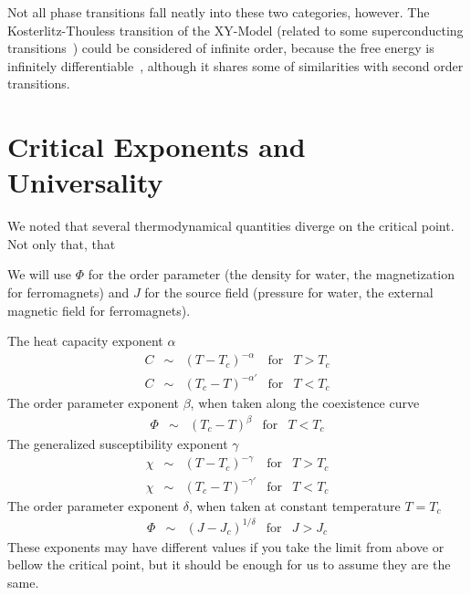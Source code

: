 Not all phase transitions fall neatly into these two categories, however. The
Kosterlitz-Thouless transition of the XY-Model (related to some superconducting
transitions~\cite{Resnick1981}) could be considered of infinite order, because
the free energy is infinitely differentiable~\cite{Kosterlitz1973}, although it
shares some of similarities with second order transitions.


\section{Critical Exponents and Universality}
\label{sec:universality}

We noted that several thermodynamical quantities diverge on the critical point.
Not only that, that

We will use $\Phi$ for the order parameter (the density for water, the
magnetization for ferromagnets) and $J$ for the source field (pressure for
water, the external magnetic field for ferromagnets).

The heat capacity exponent $\alpha$
\begin{equation}
    \begin{array}{ccccc}
        C & \sim & {\left(T-T_c\right)}^{-\alpha}  & \mbox{for} & T > T_c \\
        C & \sim & {\left(T_c-T\right)}^{-\alpha'} & \mbox{for} & T < T_c
    \end{array}
\end{equation}
The order parameter exponent $\beta$, when taken along the coexistence curve 
\begin{equation}
    \begin{array}{ccccc}
        \Phi  & \sim & {\left(T_c-T\right)}^{\beta} & \mbox{for} & T < T_c
    \end{array}
\end{equation}
The generalized susceptibility exponent $\gamma$
\begin{equation}
    \begin{array}{ccccc}
        \chi  & \sim & {\left(T-T_c\right)}^{-\gamma}  & \mbox{for} & T > T_c \\
        \chi  & \sim & {\left(T_c-T\right)}^{-\gamma'} & \mbox{for} & T < T_c
    \end{array}
\end{equation}
The order parameter exponent $\delta$, when taken at constant temperature
$T=T_c$
\begin{equation}
    \begin{array}{ccccc}
        \Phi  & \sim & {\left(J-J_c\right)}^{1/\delta} & \mbox{for} & J > J_c
    \end{array}
\end{equation}
These exponents may have different values if you take the limit from above or
bellow the critical point, but it should be enough for us to assume they are
the same.

